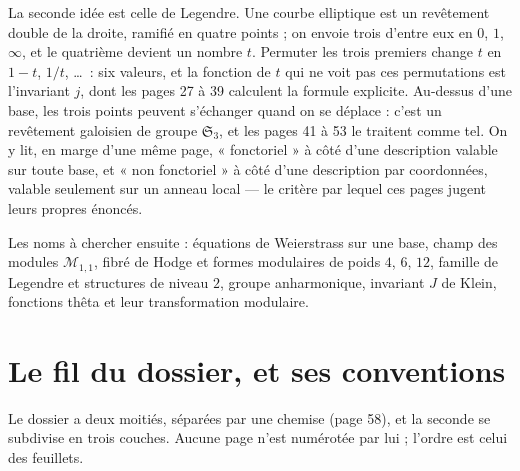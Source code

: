 \documentclass[11pt,a4paper]{article}
\begin{document}
\begin{resume}
La seconde idée est celle de Legendre. Une courbe elliptique est un revêtement
double de la droite, ramifié en quatre points ; on envoie trois d'entre eux en
$0$, $1$, $\infty$, et le quatrième devient un nombre $t$. Permuter les trois
premiers change $t$ en $1-t$, $1/t$, \ldots\ : six valeurs, et la fonction de
$t$ qui ne voit pas ces permutations est l'invariant $j$, dont les pages 27 à
39 calculent la formule explicite. Au-dessus d'une base, les trois points
peuvent s'échanger quand on se déplace : c'est un revêtement galoisien de
groupe $\mathfrak{S}_3$, et les pages 41 à 53 le traitent comme tel. On y lit,
en marge d'une même page, « fonctoriel » à côté d'une description valable sur
toute base, et « non fonctoriel » à côté d'une description par coordonnées,
valable seulement sur un anneau local --- le critère par lequel ces pages jugent
leurs propres énoncés.

Les noms à chercher ensuite : équations de Weierstrass sur une base, champ
des modules $\mathcal{M}_{1,1}$, fibré de Hodge et formes modulaires de poids
$4$, $6$, $12$, famille de Legendre et structures de niveau $2$, groupe
anharmonique, invariant $J$ de Klein, fonctions thêta et leur transformation
modulaire.

\end{resume}

\section*{Le fil du dossier, et ses conventions}

Le dossier a deux moitiés, séparées par une chemise (page 58), et la seconde se
subdivise en trois couches. Aucune page n'est numérotée par lui ; l'ordre est
celui des feuillets.
\end{document}
